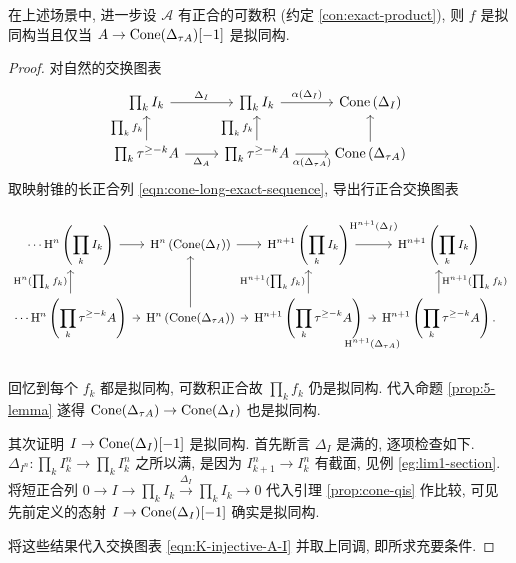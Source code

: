 \begin{lemma}\label{prop:K-injective-equiv}
	在上述场景中, 进一步设 $\mathcal{A}$ 有正合的可数积 (约定 \ref{con:exact-product}), 则 $f$ 是拟同构当且仅当 $A \to \operatorname{Cone}(\Delta_{\tau A})[-1]$ 是拟同构.
\end{lemma}
\begin{proof}
	对自然的交换图表
	\[\begin{tikzcd}
		\prod_k I_k \arrow[r, "\Delta_I"] & \prod_k I_k \arrow[r, "{\alpha(\Delta_I)}"] & \Cone\left(\Delta_I\right) \\
		\prod_k \tau^{\geq -k} A \arrow[r, "\Delta_A"'] \arrow[u, "{\prod_k f_k}"] & \prod_k \tau^{\geq -k} A \arrow[u, "{\prod_k f_k}"] \arrow[r, "{\alpha(\Delta_{\tau A})}"'] & \Cone\left( \Delta_{\tau A} \right) \arrow[u]
	\end{tikzcd}\]
	取映射锥的长正合列 \eqref{eqn:cone-long-exact-sequence}, 导出行正合交换图表
	\[\begin{tikzcd}
		[column sep=tiny, every cell/.append style = {font = \small}]
		\cdots \Hm^n\left( \displaystyle\prod_k I_k \right) \arrow[r] & \Hm^n\left( \Cone(\Delta_I) \right) \arrow[r] & \Hm^{n+1}\left( \displaystyle\prod_k I_k \right) \arrow[r, "{\Hm^{n+1}(\Delta_I)}" inner sep=1em] & \Hm^{n+1}\left( \displaystyle\prod_k I_k \right) \\
		\cdots \Hm^n\left( \displaystyle\prod_k \tau^{\geq -k} A \right) \arrow[r] \arrow[u, "{\Hm^n(\prod_k f_k)}"] & \Hm^n\left( \Cone(\Delta_{\tau A}) \right) \arrow[r] \arrow[u] & \Hm^{n+1}\left(\displaystyle\prod_k \tau^{\geq -k} A \right) \arrow[u, "{\Hm^{n+1}(\prod_k f_k)}"] \arrow[r, "{\Hm^{n+1}(\Delta_{\tau A})}"' inner sep=1.5em] & \Hm^{n+1}\left( \displaystyle\prod_k \tau^{\geq -k} A \right) \arrow[u, "{\Hm^{n+1}(\prod_k f_k)}"'] .
	\end{tikzcd}\]
	回忆到每个 $f_k$ 都是拟同构, 可数积正合故 $\prod_k f_k$ 仍是拟同构. 代入命题 \ref{prop:5-lemma} 遂得 $\operatorname{Cone}(\Delta_{\tau A}) \to \operatorname{Cone}(\Delta_I)$ 也是拟同构.
	
	其次证明 $I \to \operatorname{Cone}(\Delta_I)[-1]$ 是拟同构. 首先断言 $\Delta_I$ 是满的, 逐项检查如下. $\Delta_{I^n}: \prod_k I_k^n \to \prod_k I_k^n$ 之所以满, 是因为 $I_{k+1}^n \to I_k^n$ 有截面, 见例 \ref{eg:lim1-section}. 将短正合列 $0 \to I \to \prod_k I_k \xrightarrow{\Delta_I} \prod_k I_k \to 0$ 代入引理 \ref{prop:cone-qis} 作比较, 可见先前定义的态射 $I \to \operatorname{Cone}(\Delta_I)[-1]$ 确实是拟同构.
	
	将这些结果代入交换图表 \eqref{eqn:K-injective-A-I} 并取上同调, 即所求充要条件.
\end{proof}

